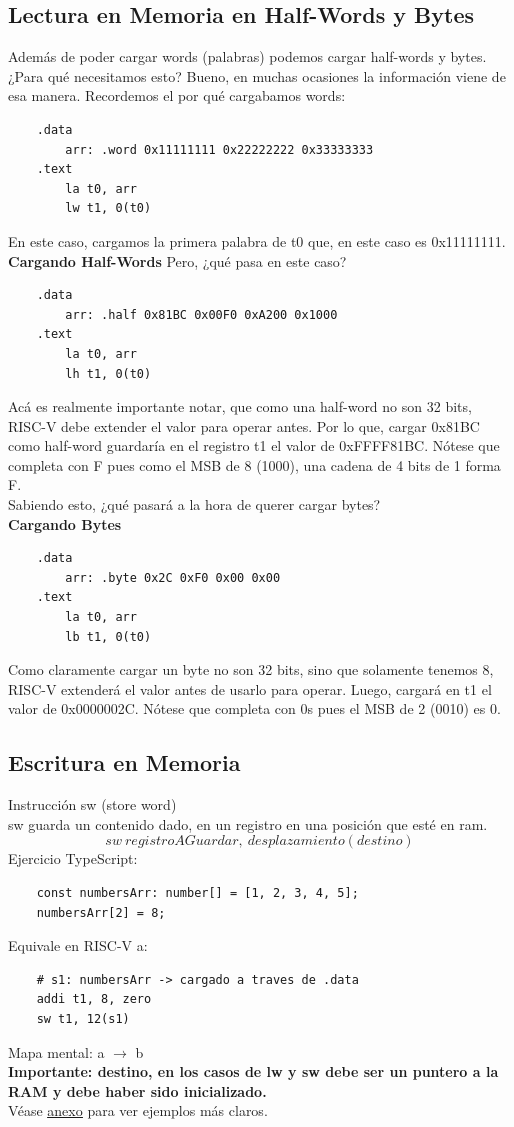 \documentclass[10pt,a4paper]{article}
\begin{document}
\subsection*{Lectura en Memoria en Half-Words y Bytes}
Además de poder cargar words (palabras) podemos cargar half-words y bytes. ¿Para qué necesitamos esto? Bueno, en muchas ocasiones la información viene de esa manera.
Recordemos el por qué cargabamos words:
\begin{lstlisting}
    .data
        arr: .word 0x11111111 0x22222222 0x33333333
    .text
        la t0, arr 
        lw t1, 0(t0)
\end{lstlisting}
En este caso, cargamos la primera palabra de t0 que, en este caso es 0x11111111. \\
\textbf{Cargando Half-Words}
Pero, ¿qué pasa en este caso? 
\begin{lstlisting}
    .data
        arr: .half 0x81BC 0x00F0 0xA200 0x1000
    .text
        la t0, arr
        lh t1, 0(t0)
\end{lstlisting}
Acá es realmente importante notar, que como una half-word no son 32 bits, RISC-V debe extender el valor para operar antes. Por lo que, cargar 0x81BC como half-word guardaría en el registro t1 el valor de 0xFFFF81BC. Nótese que completa con F pues como el MSB de 8 (1000), una cadena de 4 bits de 1 forma F. \\
Sabiendo esto, ¿qué pasará a la hora de querer cargar bytes? \\
\textbf{Cargando Bytes}
\begin{lstlisting}
    .data
        arr: .byte 0x2C 0xF0 0x00 0x00
    .text
        la t0, arr
        lb t1, 0(t0)
\end{lstlisting}
Como claramente cargar un byte no son 32 bits, sino que solamente tenemos 8, RISC-V extenderá el valor antes de usarlo para operar. Luego, cargará en t1 el valor de 0x0000002C. Nótese que completa con 0s pues el MSB de 2 (0010) es 0.
\subsection*{Escritura en Memoria} 
Instrucción sw (store word) \\
sw guarda un contenido dado, en un registro en una posición que esté en ram.
\[sw \ registroAGuardar, \ desplazamiento(destino)\] 
Ejercicio TypeScript: 
\begin{lstlisting}
    const numbersArr: number[] = [1, 2, 3, 4, 5];
    numbersArr[2] = 8; 
\end{lstlisting}
Equivale en RISC-V a:
\begin{lstlisting}
    # s1: numbersArr -> cargado a traves de .data
    addi t1, 8, zero
    sw t1, 12(s1)   
\end{lstlisting}
Mapa mental: a \( \rightarrow \) b \\
\textbf{Importante: destino, en los casos de lw y sw debe ser un puntero a la RAM y debe haber sido inicializado.} \\
Véase \hyperref[subsec:punteros_ram_registros]{\underline{anexo}} para ver ejemplos más claros. 
\end{document}
